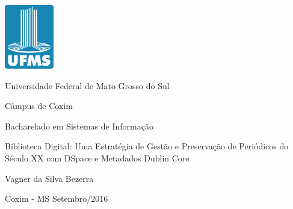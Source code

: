 
\begin{center}
	\centerline{\includegraphics[scale=1]{figuras/logo-ufms-cabecalho.png}}
	
	\vskip 0.5cm
	
{\fontsize{14pt}{14pt}\selectfont Universidade Federal de Mato Grosso do Sul}

{\fontsize{12pt}{12pt}\selectfont Câmpus de Coxim}

{\fontsize{12pt}{12pt}\selectfont Bacharelado em Sistemas de Informação}

\vskip 2.5cm

{\fontsize{16pt}{16pt}\selectfont Biblioteca Digital: Uma Estratégia de Gestão e Preservação de Periódicos do Século XX com DSpace e Metadados Dublin Core}

\vskip 2.5cm

{\fontsize{12pt}{12pt}\selectfont Vagner da Silva Bezerra}

\vskip 9.9cm

{\fontsize{12pt}{12pt}\selectfont Coxim - MS}
\break
{\fontsize{12pt}{12pt}\selectfont Setembro/2016}

\end{center}
\clearpage
\thispagestyle{empty}
\newpage



